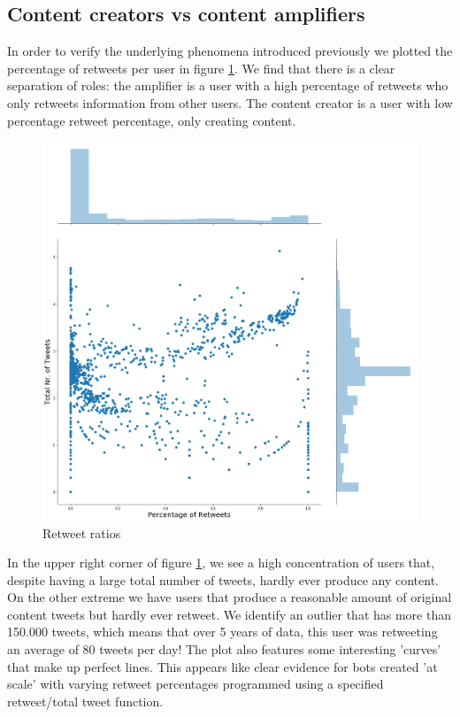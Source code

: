 \documentclass[12pt, authoryear]{elsarticle}
\begin{document}
\subsection{Content creators vs content amplifiers}

In order to verify the underlying phenomena introduced previously we plotted the percentage of retweets per user in figure \ref{retweets:1}. We find that there is a clear separation of roles: the amplifier is a user with a high percentage of retweets who only retweets information from other users. The content creator is a user with low percentage retweet percentage, only creating content.

\begin{figure}[t]
\includegraphics[width=\textwidth]{retweets}
\centering
\caption{Retweet ratios}
\label{retweets:1}
\end{figure}

In the upper right corner of figure \ref{retweets:1}, we see a high concentration of users that, despite having a large total number of tweets, hardly ever produce any content. On the other extreme we have users that produce a reasonable amount of original content tweets but hardly ever retweet. We identify an outlier that has more than 150.000 tweets, which means that over 5 years of data, this user was retweeting an average of 80 tweets per day! The plot also features some interesting 'curves' that make up perfect lines. This appears like clear evidence for bots created 'at scale' with varying retweet percentages programmed using a specified retweet/total tweet function.
\end{document}
